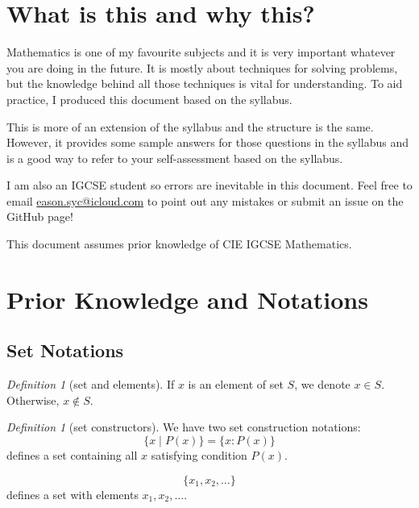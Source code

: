 \documentclass[8pt]{article}
\author{\Author}
\title{\Title}
\date{Version 1. \Date}
\theoremstyle{remark}
\newtheorem{definition}[theorem]{Definition}
\begin{document}
	\maketitle

	\tableofcontents

    \section*{What is this and why this?}

        Mathematics is one of my favourite subjects and it is very important whatever you are doing in the future. It is mostly about techniques for solving problems, but the knowledge behind all those techniques is vital for understanding. To aid practice, I produced this document based on the syllabus.

        This is more of an extension of the syllabus and the structure is the same. However, it provides some sample answers for those questions in the syllabus and is a good way to refer to your self-assessment based on the syllabus.

        I am also an IGCSE student so errors are inevitable in this document. Feel free to email \href{eason.syc@icloud.com}{eason.syc@icloud.com} to point out any mistakes or submit an issue on the GitHub page!

        This document assumes prior knowledge of CIE IGCSE Mathematics.

    \setcounter{section}{-1}
    
    \section{Prior Knowledge and Notations}
        \subsection{Set Notations}

            \begin{definition}[set and elements]
                If $x$ is an element of set $S$, we denote $x \in S$. Otherwise, $x \notin S$.
            \end{definition}

            \begin{definition}[set constructors]
                We have two set construction notations:
                $$
                    \{x \mid P(x)\} = \{x : P(x)\}
                $$
                defines a set containing all $x$ satisfying condition $P(x)$.

                $$
                    \{x_1, x_2, \ldots\}
                $$
                defines a set with elements $x_1, x_2, \ldots$.
            \end{definition}
\end{document}
